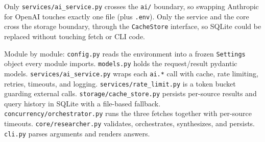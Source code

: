\documentclass[11pt,a4paper]{article}
\begin{document}
\begin{center}
\end{center}

Only \texttt{services/ai\_service.py} crosses the \texttt{ai/} boundary, so swapping Anthropic for OpenAI touches exactly one file (plus \texttt{.env}). Only the service and the core cross the storage boundary, through the \texttt{CacheStore} interface, so SQLite could be replaced without touching fetch or CLI code.

Module by module: \texttt{config.py} reads the environment into a frozen \texttt{Settings} object every module imports. \texttt{models.py} holds the request/result pydantic models. \texttt{services/ai\_service.py} wraps each \texttt{ai.*} call with cache, rate limiting, retries, timeouts, and logging. \texttt{services/rate\_limit.py} is a token bucket guarding external calls. \texttt{storage/cache\_store.py} persists per-source results and query history in SQLite with a file-based fallback. \texttt{concurrency/orchestrator.py} runs the three fetches together with per-source timeouts. \texttt{core/researcher.py} validates, orchestrates, synthesizes, and persists. \texttt{cli.py} parses arguments and renders answers.
\end{document}
